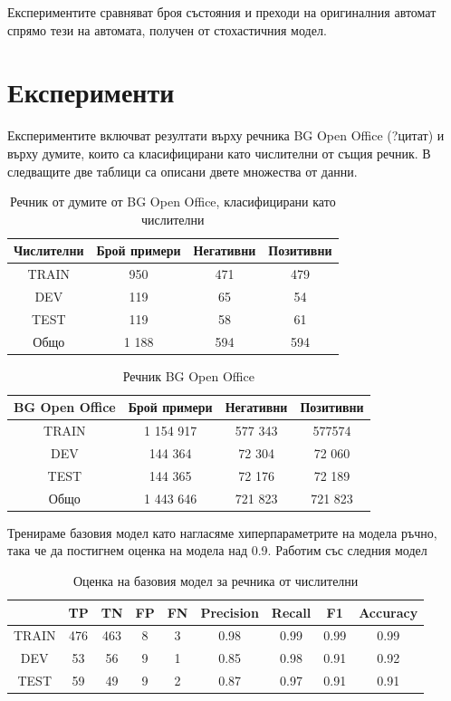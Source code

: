 \documentclass[a4paper,12pt]{article}
\begin{document}
Експериментите сравняват броя състояния и преходи на оригиналния автомат спрямо тези на автомата, получен от стохастичния модел. 

\pagebreak

\section{Експерименти}

Експериментите включват резултати върху речника BG Open Office (?цитат) и върху думите, които са класифицирани като числителни от същия речник. В следващите две таблици са описани двете множества от данни. 

\begin{table}[h!]
\centering
\begin{tabular}{|c|c|c|c|}
\hline
Числителни & Брой примери & Негативни & Позитивни\\
\hline
TRAIN & 950 & 471 & 479\\
\hline
DEV & 119 & 65 & 54\\
\hline
TEST & 119 & 58 & 61\\
\hline
Общо & 1 188 & 594 & 594\\
\hline
\end{tabular}
\caption{Речник от думите от BG Open Office, класифицирани като числителни}
\label{table:1}
\end{table}

\begin{table}[h!]
\centering
\begin{tabular}{|c|c|c|c|}
\hline
BG Open Office & Брой примери & Негативни & Позитивни\\
\hline
TRAIN & 1 154 917 & 577 343 & 577574\\
\hline
DEV & 144 364 & 72 304 & 72 060\\
\hline
TEST & 144 365 & 72 176 & 72 189\\
\hline
Общо & 1 443 646 & 721 823 & 721 823\\
\hline
\end{tabular}
\caption{Речник BG Open Office}
\label{table:2}
\end{table}

Тренираме базовия модел като нагласяме хиперпараметрите на модела ръчно, така че да постигнем оценка на модела над 0.9. Работим със следния модел

\begin{table}[h!]
\centering
\begin{tabular}{|c|c|c|c|c|c|c|c|c|}
\hline
 & TP & TN & FP & FN & Precision & Recall & F1 & Accuracy\\
\hline
TRAIN & 476 & 463 & 8 & 3 & 0.98 & 0.99 & 0.99 & 0.99\\
\hline
DEV & 53 & 56 & 9 & 1 & 0.85 & 0.98 & 0.91 & 0.92\\
\hline
TEST & 59 & 49 & 9 & 2 & 0.87 & 0.97 & 0.91 & 0.91\\
\hline
\end{tabular}
\caption{Оценка на базовия модел за речника от числителни}
\label{table:2}
\end{table}
\end{document}

